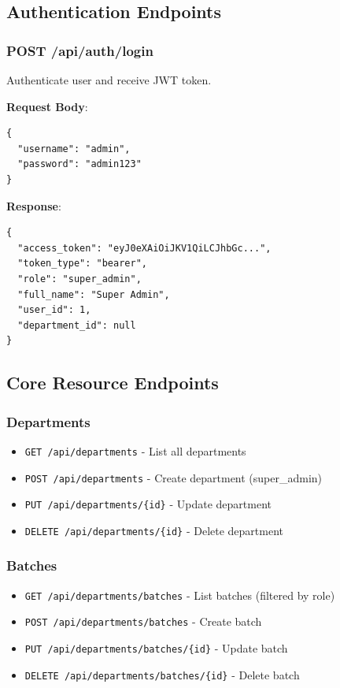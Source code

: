 \documentclass[12pt,a4paper]{article}
\begin{document}
\subsection{Authentication Endpoints}

\subsubsection{POST /api/auth/login}
Authenticate user and receive JWT token.

\textbf{Request Body}:
\begin{verbatim}
{
  "username": "admin",
  "password": "admin123"
}
\end{verbatim}

\textbf{Response}:
\begin{verbatim}
{
  "access_token": "eyJ0eXAiOiJKV1QiLCJhbGc...",
  "token_type": "bearer",
  "role": "super_admin",
  "full_name": "Super Admin",
  "user_id": 1,
  "department_id": null
}
\end{verbatim}


\subsection{Core Resource Endpoints}

\subsubsection{Departments}
\begin{itemize}
    \item \texttt{GET /api/departments} - List all departments
    \item \texttt{POST /api/departments} - Create department (super\_admin)
    \item \texttt{PUT /api/departments/\{id\}} - Update department
    \item \texttt{DELETE /api/departments/\{id\}} - Delete department
\end{itemize}

\subsubsection{Batches}
\begin{itemize}
    \item \texttt{GET /api/departments/batches} - List batches (filtered by role)
    \item \texttt{POST /api/departments/batches} - Create batch
    \item \texttt{PUT /api/departments/batches/\{id\}} - Update batch
    \item \texttt{DELETE /api/departments/batches/\{id\}} - Delete batch
\end{itemize}
\end{document}
